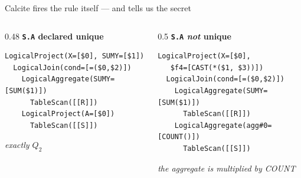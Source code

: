 \documentclass[9pt,aspectratio=169]{beamer}
\begin{document}
\begin{frame}[fragile]{Calcite fires the rule itself --- and tells us the secret}
\begin{columns}[T]
\begin{column}{0.48\textwidth}
\centering\textbf{\small\texttt{S.A} declared unique}
\begin{lstlisting}[style=plan,basicstyle=\ttfamily\tiny]
LogicalProject(X=[$0], SUMY=[$1])
  LogicalJoin(cond=[=($0,$2)])
    LogicalAggregate(SUMY=[SUM($1)])
      TableScan([[R]])
    LogicalProject(A=[$0])
      TableScan([[S]])
\end{lstlisting}
{\footnotesize\itshape exactly $Q_2$}
\end{column}
\begin{column}{0.5\textwidth}
\centering\textbf{\small\texttt{S.A} \emph{not} unique}
\begin{lstlisting}[style=plan,basicstyle=\ttfamily\tiny]
LogicalProject(X=[$0],
   $f4=[CAST(*($1, $3))])
  LogicalJoin(cond=[=($0,$2)])
    LogicalAggregate(SUMY=[SUM($1)])
      TableScan([[R]])
    LogicalAggregate(agg#0=[COUNT()])
      TableScan([[S]])
\end{lstlisting}
{\footnotesize\itshape the aggregate is \alert{multiplied by COUNT}}
\end{column}
\end{columns}
\vspace{2mm}
\end{frame}
\end{document}
